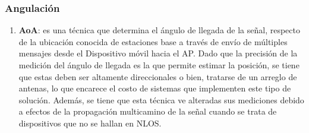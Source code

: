 \subsubsection{\textbf{Angulación}}
    \begin{enumerate}
        \item {\textbf{\ac{AoA}}: es una técnica que determina el ángulo de llegada de la señal, respecto de la ubicación conocida de estaciones base a través de envío de múltiples mensajes desde el Dispositivo móvil hacia el AP. Dado que la precisión de la medición del ángulo de llegada es la que permite estimar la posición, se tiene que estas deben ser altamente direccionales o bien, tratarse de un arreglo de antenas, lo que encarece el costo de sistemas que implementen este tipo de solución. Además, se tiene que esta técnica ve alteradas sus mediciones debido a efectos de la propagación multicamino de la señal cuando se trata de dispositivos que no se hallan en \ac{NLOS}.
        
}
\end{enumerate}
